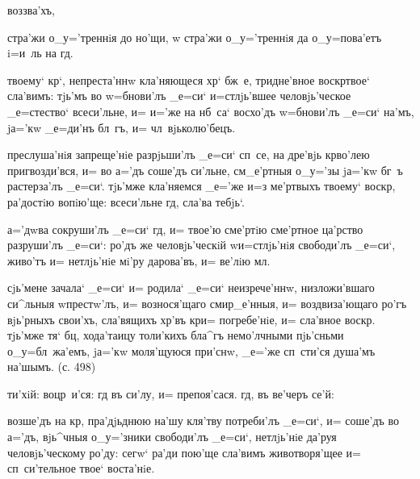 
     воззва'хъ, 

 стра'жи о_у='треннiя до но'щи, w\т 
стра'жи о_у='треннiя да о_у=пова'етъ i=и~ль на гд.

 твоему` кр`, непреста'ннw 
кла'няющеся хр` бж~е, тридне'вное воскр твое` 
сла'вимъ: тjь'мъ во w=бнови'лъ _е=си` и=стлjь'вшее 
человjь'ческое _е=стество` всеси'льне, и= и='же на нб~са` 
восхо'дъ w=бнови'лъ _е=си` на'мъ, jа='кw _е=ди'нъ бл~гъ, 
и= чл~вjьколю'бецъ. 

 преслуша'нiя запреще'нiе разрjьши'лъ _е=си` 
сп~се, на дре'вjь кр во'лею пригвозди'вся, и= во 
а='дъ соше'дъ си'льне, см_е'ртныя о_у='зы jа='кw бг~ъ 
растерза'лъ _е=си`. тjь'мже кла'няемся _е='же и=з\ъ 
ме'ртвыхъ твоему` воскр, ра'достiю вопiю'ще: 
всеси'льне гд, сла'ва тебjь`.

 а='дwва сокруши'лъ _е=си` гд, и= твое'ю 
сме'ртiю сме'ртное ца'рство разруши'лъ _е=си`: ро'дъ же 
человjь'ческiй w\т и=стлjь'нiя свободи'лъ _е=си`, живо'тъ 
и= нетлjь'нiе мi'ру дарова'въ, и= ве'лiю мл.


 сjь'мене зачала` _е=си` и= родила` _е=си` 
неизрече'ннw, низложи'вшаго си^льныя w\т престw'лъ, и= 
вознося'щаго смир_е'нныя, и= воздвиза'ющаго ро'гъ 
вjь'рныхъ свои'хъ, сла'вящихъ хр'въ кр и= 
погребе'нiе, и= сла'вное воскр. тjь'мже тя` бц, 
хода'таицу толи'кихъ бла^гъ немо'лчными пjь'сньми 
о_у=бл~жа'емъ, jа='кw моля'щуюся при'снw, _е='же 
сп~сти'ся душа'мъ на'шымъ. (с. 498)

  ти'хiй:    воцр~и'ся:   гд 
въ си'лу, и= препоя'сася.   гд, въ 
ве'черъ се'й: 


 возше'дъ на кр, пра'дjьднюю на'шу 
кля'тву потреби'лъ _е=си`, и= соше'дъ во а='дъ, вjь^чныя 
о_у='зники свободи'лъ _е=си`, нетлjь'нiе да'руя 
человjь'ческому ро'ду: сегw` ра'ди пою'ще сла'вимъ 
животворя'щее и= сп~си'тельное твое` воста'нiе.

